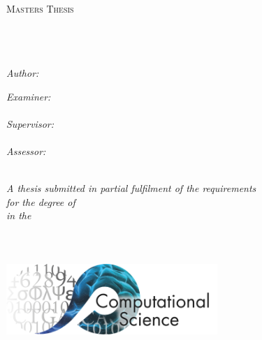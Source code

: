 \documentclass[11pt, oneside]{Thesis} %
\begin{document}
\begin{titlepage}
\begin{center}

\textsc{\LARGE \univname}\\[1.5cm] %
\textsc{\Large Masters Thesis}\\[0.5cm] %

\HRule \\[0.4cm] %
{\huge \bfseries \ttitle}\\[0.4cm] %
\HRule \\[1.5cm] %
 
\begin{minipage}{0.4\textwidth}
\begin{flushleft} \large
\emph{Author:}\\
\authornames %
\end{flushleft}
\end{minipage}
\begin{minipage}{0.4\textwidth}
\begin{flushright} \large
\emph{Examiner:} \\
{\exname}\\
\emph{Supervisor:} \\
{\supname}\\
\emph{Assessor:} \\
{\assessorname}
\end{flushright}
\end{minipage}\\[1cm]
 
\large \textit{A thesis submitted in partial fulfilment of the requirements\\ for the degree of \degreename}\\[0.3cm] %
\textit{in the}\\[0.4cm]
\groupname\\\deptname\\[1cm] %
 
{\large \todayy}\\[2cm] %
\includegraphics[width=0.6\textwidth]{clslogo.png} %
 
\vfill
\end{center}

\end{titlepage}
\end{document}
